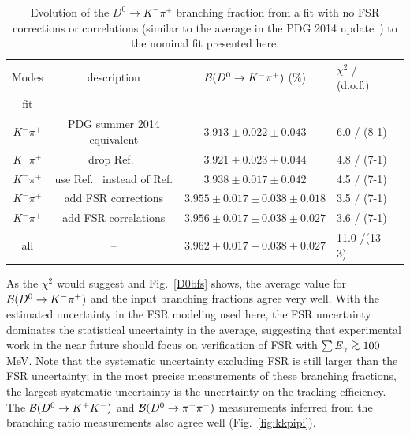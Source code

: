 \begin{table}[b]
  \centering 
  \caption{Evolution of the $D^0\to K^-\pi^+$ branching fraction from a fit with
  no FSR corrections or correlations (similar to the average in the %
  PDG 2014 update~\cite{PDG_2014}) to the nominal fit presented
here.}\label{tab:fit_evolution}
\begin{tabular}{cccll}
\hline\hline
Modes &  description                       & ${\cal B}(D^0\to K^-\pi^+)$ (\%)           & $\chi^2$ / (d.o.f.) \\
fit        &                               &                                       & \\ \hline
$K^-\pi^+$ & PDG summer 2014 equivalent    & $3.913 \pm 0.022 \pm 0.043 $ & 6.0 / (8-1)\\
$K^-\pi^+$ & drop Ref.~\cite{Coan:1997ye}  & $3.921 \pm 0.023 \pm 0.044$           & 4.8 / (7-1)\\
$K^-\pi^+$ & use Ref.~\cite{Bonvicini:2013vxi} instead of Ref.\cite{Dobbs:2007zt}  & $3.938 \pm 0.017 \pm 0.042$ & 4.5 / (7-1)\\
$K^-\pi^+$ & add FSR corrections           & $3.955 \pm 0.017 \pm 0.038 \pm 0.018$ & 3.5 / (7-1)\\
$K^-\pi^+$ & add FSR correlations          & $3.956 \pm 0.017 \pm 0.038 \pm 0.027$ & 3.6 / (7-1)\\
all        & --   & $3.962 \pm 0.017 \pm 0.038 \pm 0.027$ &11.0 /(13-3) \\
\hline
\end{tabular}
\end{table}

As the $\chi^2$ would suggest and Fig.~\ref{D0bfs} shows, the average 
value for ${\cal B}(D^0\to K^-\pi^+)$ and
the input branching fractions agree very well.  With the estimated 
uncertainty in the FSR modeling used here,
the FSR uncertainty dominates the statistical uncertainty 
in the average, suggesting that experimental
work in the near future should focus on verification of FSR with 
$\sum E_\gamma \simge 100$ MeV.  Note that the systematic uncertainty 
excluding FSR
is still larger than the FSR uncertainty; in the most 
precise measurements of these branching fractions, the 
largest systematic
uncertainty is the uncertainty on the tracking efficiency. The ${\cal B}(D^0\to
K^+K^-)$ and ${\cal B}(D^0\to \pi^+\pi^-)$ measurements inferred
from the branching ratio measurements also agree well 
(Fig.~\ref{fig:kkpipi}). 


